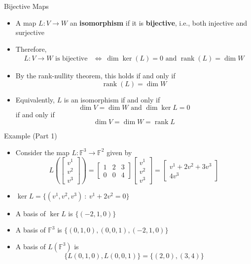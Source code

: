 \documentclass[usenames,dvipsnames,10pt]{beamer}
\newcommand\F{\mathbb{F}}
\newcommand\rank{\operatorname{rank}}
\begin{document}
\begin{frame}
  {Bijective Maps}

  \begin{itemize}
  \item A map $L: V \rightarrow W$ an {\bf isomorphism} if it is {\bf bijective}, i.e., both injective and surjective
  \item Therefore,
    \begin{align*}
      L: V \rightarrow W\text{ is bijective} &\iff\ \dim\ker(L) = 0\text{ and }\rank(L) = \dim W
    \end{align*}
  \item By the rank-nullity theorem, this holds if and only if
    \[
      \rank(L) = \dim W
    \]
  \item Equivalently, $L$ is an isomorphism if and only if
    \[
      \dim V = \dim W\text{ and }\dim \ker L = 0
    \]
    if and only if
    \[
      \dim V = \dim W = \rank L
    \]
  \end{itemize}
\end{frame}

\begin{frame}
  {Example (Part 1)}

  \begin{itemize}
  \item Consider the map $L: \F^3 \rightarrow \F^2$ given by
    \[
      L\left(\begin{bmatrix} v^1 \\ v^2 \\ v^3 \end{bmatrix}\right)
      =
      \begin{bmatrix} 1 & 2 & 3 \\ 0 & 0 & 4 \end{bmatrix}
      \begin{bmatrix} v^1 \\ v^2 \\ v^3 \end{bmatrix}
      = \begin{bmatrix} v^1 + 2v^2 + 3v^3 \\ 4v^3 \end{bmatrix}
    \]
  \item $\ker L = \{ (v^1,v^2,v^3)\ :\ v^1 + 2v^2 = 0 \}$
  \item A basis of $\ker L$ is $\{ (-2,1,0) \}$
  \item A basis of $\F^3$ is $\{ (0,1,0), (0,0,1), (-2,1,0) \}$
  \item A basis of $L(\F^3)$ is
    \[
      \{ L(0,1,0), L(0,0,1) \} = \{ (2,0), (3, 4) \}
    \]
  \end{itemize}
\end{frame}
\end{document}
